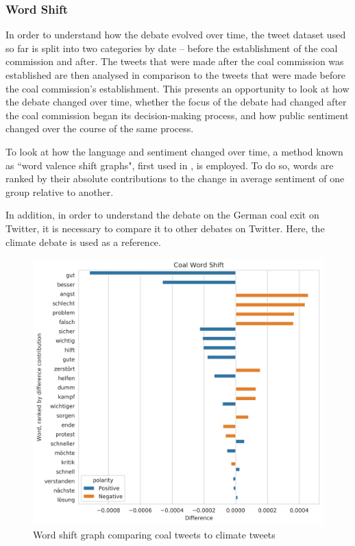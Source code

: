 \documentclass[10pt,twocolumn,twoside]{layout}
\begin{document}
\subsubsection*{Word Shift}
In order to understand how the debate evolved over time, the tweet dataset used so far is split into two categories by date -- before the establishment of the coal commission and after. The tweets that were made after the coal commission was established are then analysed in comparison to the tweets that were made before the coal commission's establishment. This presents an opportunity to look at how the debate changed over time, whether the focus of the debate had changed after the coal commission began its decision-making process, and how public sentiment changed over the course of the same process. 

To look at how the language and sentiment changed over time, a method known as ``word valence shift graphs", first used in \cite{Dodds2011}, is employed. To do so, words are ranked by their absolute contributions to the change in average sentiment of one group relative to another. 



In addition, in order to understand the debate on the German coal exit on Twitter, it is necessary to compare it to other debates on Twitter. Here, the climate debate is used as a reference. 

\begin{figure} 
	\begin{center}
		\includegraphics[width=\linewidth]{figures/wordshift_coal_climate}
	\end{center}
	\caption{Word shift graph comparing coal tweets to climate tweets}
	\label{fig:wordshift_coal_climate}
\end{figure}
\end{document}
